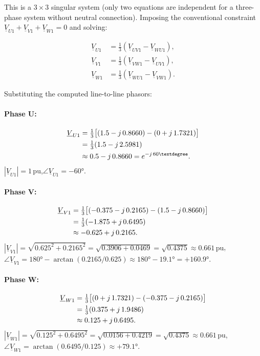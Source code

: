 \documentclass[a4paper,11pt]{article}
\begin{document}
This is a $3\times 3$ singular system (only two equations are independent
for a three-phase system without neutral connection).  Imposing the
conventional constraint $\underline{V}_{U1}+\underline{V}_{V1}+\underline{V}_{W1}=0$
and solving:

\begin{align}
\underline{V}_{U1} &= \tfrac{1}{3}\!\left(\underline{V}_{UV1}-\underline{V}_{WU1}\right),\\
\underline{V}_{V1} &= \tfrac{1}{3}\!\left(\underline{V}_{VW1}-\underline{V}_{UV1}\right),\\
\underline{V}_{W1} &= \tfrac{1}{3}\!\left(\underline{V}_{WU1}-\underline{V}_{VW1}\right).
\end{align}

Substituting the computed line-to-line phasors:

\paragraph{Phase U:}
\begin{align}
\underline{V}_{U1}
  &= \tfrac{1}{3}\bigl[(1.5-j\,0.8660)-(0+j\,1.7321)\bigr]\notag\\
  &= \tfrac{1}{3}(1.5 - j\,2.5981)\notag\\
  &\approx 0.5 - j\,0.8660
   = e^{-j\,60°}.
\end{align}
$|\underline{V}_{U1}|=1\,\mathrm{pu}$,\quad $\angle\underline{V}_{U1}=-60°$.

\paragraph{Phase V:}
\begin{align}
\underline{V}_{V1}
  &= \tfrac{1}{3}\bigl[(-0.375-j\,0.2165)-(1.5-j\,0.8660)\bigr]\notag\\
  &= \tfrac{1}{3}(-1.875+j\,0.6495)\notag\\
  &\approx -0.625 + j\,0.2165.
\end{align}
$|\underline{V}_{V1}|=\sqrt{0.625^2+0.2165^2}=\sqrt{0.3906+0.0469}=\sqrt{0.4375}\approx
\mathbf{0.661\,\mathrm{pu}}$,\quad
$\angle\underline{V}_{V1}=180°-\arctan(0.2165/0.625)\approx 180°-19.1°=+160.9°$.

\paragraph{Phase W:}
\begin{align}
\underline{V}_{W1}
  &= \tfrac{1}{3}\bigl[(0+j\,1.7321)-(-0.375-j\,0.2165)\bigr]\notag\\
  &= \tfrac{1}{3}(0.375+j\,1.9486)\notag\\
  &\approx 0.125 + j\,0.6495.
\end{align}
$|\underline{V}_{W1}|=\sqrt{0.125^2+0.6495^2}=\sqrt{0.0156+0.4219}=\sqrt{0.4375}\approx
\mathbf{0.661\,\mathrm{pu}}$,\quad
$\angle\underline{V}_{W1}=\arctan(0.6495/0.125)\approx+79.1°$.
\end{document}
